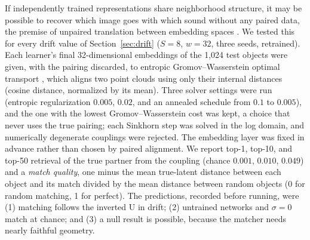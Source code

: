 \documentclass[11pt]{article}
\begin{document}
If independently trained representations share neighborhood structure, it may be possible to recover which image goes with which sound without any paired data, the premise of unpaired translation between embedding spaces \citep{jha2025vec2vec}. We tested this for every drift value of Section~\ref{sec:drift} ($S=8$, $w=32$, three seeds, retrained). Each learner's final 32-dimensional embeddings of the 1{,}024 test objects were given, with the pairing discarded, to entropic Gromov--Wasserstein optimal transport \citep{peyre2016gromov}, which aligns two point clouds using only their internal distances (cosine distance, normalized by its mean). Three solver settings were run (entropic regularization $0.005$, $0.02$, and an annealed schedule from $0.1$ to $0.005$), and the one with the lowest Gromov--Wasserstein cost was kept, a choice that never uses the true pairing; each Sinkhorn step was solved in the log domain, and numerically degenerate couplings were rejected. The embedding layer was fixed in advance rather than chosen by paired alignment. We report top-1, top-10, and top-50 retrieval of the true partner from the coupling (chance $0.001$, $0.010$, $0.049$) and a \emph{match quality}, one minus the mean true-latent distance between each object and its match divided by the mean distance between random objects (0 for random matching, 1 for perfect). The predictions, recorded before running, were (1) matching follows the inverted U in drift; (2) untrained networks and $\sigma=0$ match at chance; and (3) a null result is possible, because the matcher needs nearly faithful geometry.
\end{document}

